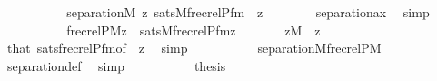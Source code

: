 \begin{isabellebody}
\ \ \ \ \isamarkupfalse%
\isanewline
\ \ \ \ \isamarkupfalse%
\ {\isachardoublequoteopen}separation{\isacharparenleft}{\kern0pt}{\isacharhash}{\kern0pt}{\isacharhash}{\kern0pt}M{\isacharcomma}{\kern0pt}\ {\isasymlambda}z{\isachardot}{\kern0pt}\ sats{\isacharparenleft}{\kern0pt}M{\isacharcomma}{\kern0pt}frecrelP{\isacharunderscore}{\kern0pt}fm{\isacharparenleft}{\kern0pt}{}{\isacharparenright}{\kern0pt}\ {\isacharcomma}{\kern0pt}\ {\isacharbrackleft}{\kern0pt}z{\isacharbrackright}{\kern0pt}{\isacharparenright}{\kern0pt}{\isacharparenright}{\kern0pt}{\isachardoublequoteclose}\isanewline
\ \ \ \ \ \ \isamarkupfalse%
\ separation{\isacharunderscore}{\kern0pt}ax\ \isamarkupfalse%
\ simp\isanewline
\ \ \ \ \isamarkupfalse%
\isanewline
\ \ \ \ \isamarkupfalse%
\ {\isachardoublequoteopen}frecrelP{\isacharparenleft}{\kern0pt}{\isacharhash}{\kern0pt}{\isacharhash}{\kern0pt}M{\isacharcomma}{\kern0pt}z{\isacharparenright}{\kern0pt}\ {\isasymlongleftrightarrow}\ sats{\isacharparenleft}{\kern0pt}M{\isacharcomma}{\kern0pt}frecrelP{\isacharunderscore}{\kern0pt}fm{\isacharparenleft}{\kern0pt}{}{\isacharparenright}{\kern0pt}{\isacharcomma}{\kern0pt}{\isacharbrackleft}{\kern0pt}z{\isacharbrackright}{\kern0pt}{\isacharparenright}{\kern0pt}{\isachardoublequoteclose}\isanewline
\ \ \ \ \ \ \ {\isachardoublequoteopen}z{\isasymin}M{\isachardoublequoteclose}\ \ z\isanewline
\ \ \ \ \ \ \isamarkupfalse%
\ that\ sats{\isacharunderscore}{\kern0pt}frecrelP{\isacharunderscore}{\kern0pt}fm{\isacharbrackleft}{\kern0pt}of\ {}\ {\isachardoublequoteopen}{\isacharbrackleft}{\kern0pt}z{\isacharbrackright}{\kern0pt}{\isachardoublequoteclose}{\isacharbrackright}{\kern0pt}\ \isamarkupfalse%
\ simp\isanewline
\ \ \ \ \isamarkupfalse%
\isanewline
\ \ \ \ \isamarkupfalse%
\ {\isachardoublequoteopen}separation{\isacharparenleft}{\kern0pt}{\isacharhash}{\kern0pt}{\isacharhash}{\kern0pt}M{\isacharcomma}{\kern0pt}frecrelP{\isacharparenleft}{\kern0pt}{\isacharhash}{\kern0pt}{\isacharhash}{\kern0pt}M{\isacharparenright}{\kern0pt}{\isacharparenright}{\kern0pt}{\isachardoublequoteclose}\isanewline
\ \ \ \ \ \ \isamarkupfalse%
\ separation{\isacharunderscore}{\kern0pt}def\ \isamarkupfalse%
\ simp\isanewline
\ \ \ \ \isamarkupfalse%
\isanewline
\ \ \ \ \isamarkupfalse%
\ {\isacharquery}{\kern0pt}thesis\ \isamarkupfalse%

\end{isabellebody}
